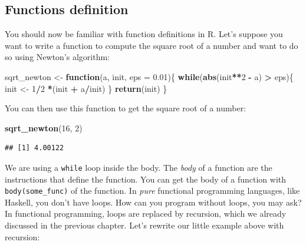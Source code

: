 \documentclass[]{gitbook}
\newenvironment{Shaded}{\begin{snugshade}}{\end{snugshade}}
\newcommand{\ControlFlowTok}[1]{\textcolor[rgb]{0.13,0.29,0.53}{\textbf{#1}}}
\newcommand{\DataTypeTok}[1]{\textcolor[rgb]{0.13,0.29,0.53}{#1}}
\newcommand{\DecValTok}[1]{\textcolor[rgb]{0.00,0.00,0.81}{#1}}
\newcommand{\FloatTok}[1]{\textcolor[rgb]{0.00,0.00,0.81}{#1}}
\newcommand{\KeywordTok}[1]{\textcolor[rgb]{0.13,0.29,0.53}{\textbf{#1}}}
\newcommand{\NormalTok}[1]{#1}
\newcommand{\OperatorTok}[1]{\textcolor[rgb]{0.81,0.36,0.00}{\textbf{#1}}}
\newcommand{\StringTok}[1]{\textcolor[rgb]{0.31,0.60,0.02}{#1}}
\begin{document}
\hypertarget{functions-definition}{%
\subsection{Functions definition}\label{functions-definition}}

You should now be familiar with function definitions in R. Let's suppose you want to write a function
to compute the square root of a number and want to do so using Newton's algorithm:

\begin{Shaded}
\begin{Highlighting}[]
\NormalTok{sqrt_newton <-}\StringTok{ }\ControlFlowTok{function}\NormalTok{(a, init, }\DataTypeTok{eps =} \FloatTok{0.01}\NormalTok{)\{}
    \ControlFlowTok{while}\NormalTok{(}\KeywordTok{abs}\NormalTok{(init}\OperatorTok{**}\DecValTok{2} \OperatorTok{-}\StringTok{ }\NormalTok{a) }\OperatorTok{>}\StringTok{ }\NormalTok{eps)\{}
\NormalTok{        init <-}\StringTok{ }\DecValTok{1}\OperatorTok{/}\DecValTok{2} \OperatorTok{*}\NormalTok{(init }\OperatorTok{+}\StringTok{ }\NormalTok{a}\OperatorTok{/}\NormalTok{init)}
\NormalTok{    \}}
    \KeywordTok{return}\NormalTok{(init)}
\NormalTok{\}}
\end{Highlighting}
\end{Shaded}

You can then use this function to get the square root of a number:

\begin{Shaded}
\begin{Highlighting}[]
\KeywordTok{sqrt_newton}\NormalTok{(}\DecValTok{16}\NormalTok{, }\DecValTok{2}\NormalTok{)}
\end{Highlighting}
\end{Shaded}

\begin{verbatim}
## [1] 4.00122
\end{verbatim}

We are using a \texttt{while} loop inside the body. The \emph{body} of a function are the instructions that
define the function. You can get the body of a function with \texttt{body(some\_func)} of the function.
In \emph{pure} functional programming languages, like Haskell, you don't have loops. How can you
program without loops, you may ask? In functional programming, loops are replaced by recursion,
which we already discussed in the previous chapter. Let's rewrite our little example above
with recursion:
\end{document}
